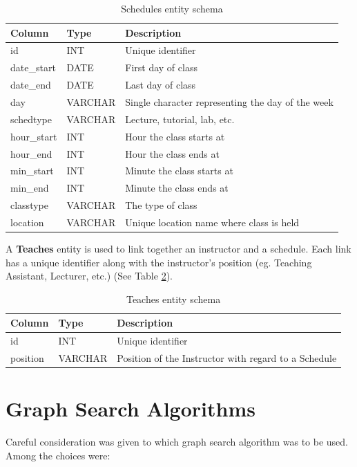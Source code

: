 \documentclass[12pt,letterpaper,oneside]{report}
\theoremstyle{definition}
\begin{document}
			\begin{table}[!htp]
				\centering
				\begin{tabular}{lll}
					\toprule
					Column & Type & Description \\
					\midrule
					id & INT & Unique identifier \\
					date\_start & DATE & First day of class \\
					date\_end & DATE & Last day of class \\
					day & VARCHAR & Single character representing the day of the week \\
					schedtype & VARCHAR & Lecture, tutorial, lab, etc. \\
					hour\_start & INT & Hour the class starts at \\
					hour\_end & INT & Hour the class ends at \\
					min\_start & INT & Minute the class starts at \\
					min\_end & INT & Minute the class ends at \\
					classtype & VARCHAR & The type of class \\
					location & VARCHAR & Unique location name where class is held \\
					\bottomrule
				\end{tabular}
				\caption{Schedules entity schema}
				\label{tbl:schedules-entity-schema}
			\end{table}
			
			A \textbf{Teaches} entity is used to link together an instructor and a schedule.  Each link has a unique identifier along with the instructor's position (eg. Teaching Assistant, Lecturer, etc.) (See Table \ref{tbl:teaches-entity-schema}).
			
			\begin{table}[!htp]
				\centering
				\begin{tabular}{lll}
					\toprule
					Column & Type & Description \\
					\midrule
					id & INT & Unique identifier \\
					position & VARCHAR & Position of the Instructor with regard to a Schedule \\
					\bottomrule
				\end{tabular}
				\caption{Teaches entity schema}
				\label{tbl:teaches-entity-schema}
			\end{table}
		
		\section{Graph Search Algorithms}
		\label{sec:graph-search-algos}
			Careful consideration was given to which graph search algorithm was to be used.  Among the choices were:
			
\end{document}
